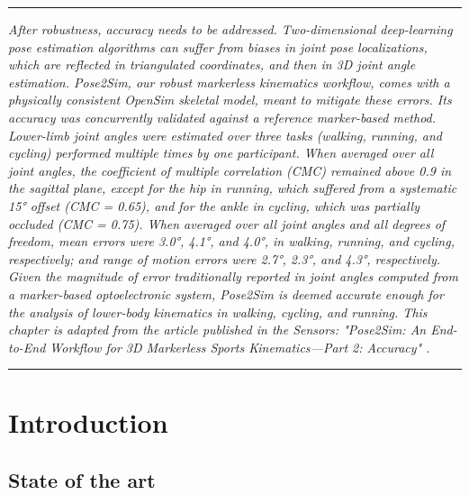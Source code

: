 \begin{center}
\rule{0.7\linewidth}{.5pt}
\begin{minipage}{0.7\linewidth}
\smallskip

\textit{After robustness, accuracy needs to be addressed. Two-dimensional deep-learning pose estimation algorithms can suffer from biases in joint pose localizations, which are reflected in triangulated coordinates, and then in 3D joint angle estimation. Pose2Sim, our robust markerless kinematics workflow, comes with a physically consistent OpenSim skeletal model, meant to mitigate these errors. \newline\newline
Its accuracy was concurrently validated against a reference marker-based method. Lower-limb joint angles were estimated over three tasks (walking, running, and cycling) performed multiple times by one participant. When averaged over all joint angles, the coefficient of multiple correlation (CMC) remained above 0.9 in the sagittal plane, except for the hip in running, which suffered from a systematic 15° offset (CMC = 0.65), and for the ankle in cycling, which was partially occluded (CMC = 0.75). When averaged over all joint angles and all degrees of freedom, mean errors were 3.0°, 4.1°, and 4.0°, in walking, running, and cycling, respectively; and range of motion errors were 2.7°, 2.3°, and 4.3°, respectively. Given the magnitude of error traditionally reported in joint angles computed from a marker-based optoelectronic system, Pose2Sim is deemed accurate enough for the analysis of lower-body kinematics in walking, cycling, and running. \newline\newline
This chapter is adapted from the article published in the Sensors: "Pose2Sim: An End-to-End Workflow for 3D Markerless Sports Kinematics—Part 2: Accuracy" \cite{Pagnon2022a}.
}

\end{minipage}
\smallskip
\rule{0.7\linewidth}{.5pt}
\end{center}

\pagebreak
\minitoc
\newpage


\section{Introduction}


\subsection{State of the art}

